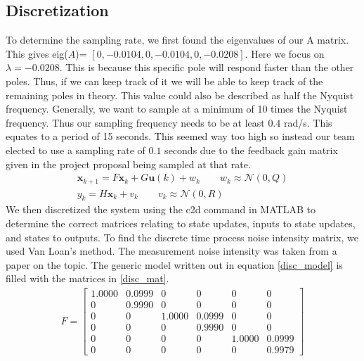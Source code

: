 \documentclass[12pt]{extarticle}
\begin{document}
\subsection{Discretization}{
    To determine the sampling rate, we first found the eigenvalues of our A matrix. This gives eig($A$)=
    $[0,-0.0104,0,-0.0104,0,-0.0208]$.  Here we focus on $\lambda=-0.0208$.  This is because this specific pole will respond faster than the other poles.  Thus, if we can keep track of it we will be able to keep track of the remaining poles in theory.  This value could also be described as half the Nyquist frequency.  Generally, we want to sample at a minimum of 10 times the Nyquist frequency.  Thus our sampling frequency needs to be at least $0.4$ rad/s. This equates to a period of 15 seconds.  This seemed way too high so instead our team elected to use a sampling rate of $0.1$ seconds due to the feedback gain matrix given in the project proposal being sampled at that rate.
    \begin{equation}\label{disc_model}
    \begin{split}
        \pmb{x}_{k+1}=F\pmb{x}_k+G\pmb{u}(k)+w_k\qquad w_k\approx\mathcal{N}(0,Q)\\
        y_k=H\pmb{x}_k+v_k\qquad v_k\approx\mathcal{N}(0,R)
    \end{split}
    \end{equation}
    We then discretized the system using the c2d command in MATLAB to determine the correct matrices relating to state updates, inputs to state updates, and states to outputs. To find the discrete time process noise intensity matrix, we used Van Loan's method. The measurement noise intensity was taken from a paper on the topic. The generic model written out in equation \ref{disc_model} is filled with the matrices in \ref{disc_mat}.
    \begin{equation}\label{disc_mat}
    \begin{split}
        F=\begin{bmatrix}
        1.0000  &  0.0999  &   0    &     0      &   0    &     0\\
        0    &0.9990     &    0    &     0      &   0   &      0\\
         0    &     0    &1.0000   & 0.0999     &    0  &       0\\
         0     &    0    &     0   & 0.9990     &    0  &       0\\
         0      &   0    &     0   &      0    &1.0000  &  0.0999\\
         0       &  0    &     0    &     0 &    0  &  0.9979

\end{bmatrix}
\end{split}
\end{equation}}
\end{document}
